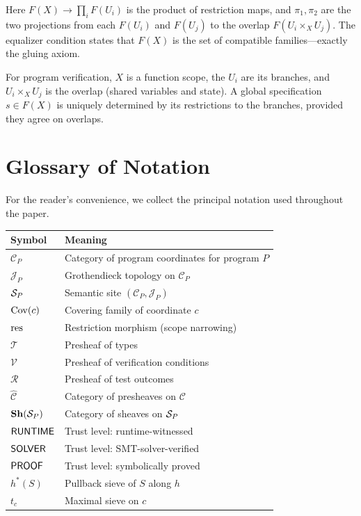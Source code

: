 \documentclass[11pt]{article}
\begin{document}
Here $F(X) \to \prod_i F(U_i)$ is the product of restriction maps, and
$\pi_1, \pi_2$ are the two projections from each $F(U_i)$ and $F(U_j)$ to
the overlap $F(U_i \times_X U_j)$.  The equalizer condition states that
$F(X)$ is the set of compatible families---exactly the gluing axiom.

For program verification, $X$ is a function scope, the $U_i$ are its branches,
and $U_i \times_X U_j$ is the overlap (shared variables and state).  A global
specification $s \in F(X)$ is uniquely determined by its restrictions to the
branches, provided they agree on overlaps.

\section{Glossary of Notation}\label{app:notation}

For the reader's convenience, we collect the principal notation used
throughout the paper.

\medskip
\begin{center}
\begin{tabular}{@{}ll@{}}
\toprule
\textbf{Symbol} & \textbf{Meaning} \\
\midrule
$\mathcal{C}_P$ & Category of program coordinates for program $P$ \\
$\mathscr{J}_P$ & Grothendieck topology on $\mathcal{C}_P$ \\
$\mathcal{S}_P$ & Semantic site $(\mathcal{C}_P, \mathscr{J}_P)$ \\
$\mathrm{Cov}(c)$ & Covering family of coordinate $c$ \\
$\mathrm{res}$ & Restriction morphism (scope narrowing) \\
$\mathcal{T}$ & Presheaf of types \\
$\mathcal{V}$ & Presheaf of verification conditions \\
$\mathcal{R}$ & Presheaf of test outcomes \\
$\widehat{\mathcal{C}}$ & Category of presheaves on $\mathcal{C}$ \\
$\mathbf{Sh}(\mathcal{S}_P)$ & Category of sheaves on $\mathcal{S}_P$ \\
$\mathsf{RUNTIME}$ & Trust level: runtime-witnessed \\
$\mathsf{SOLVER}$ & Trust level: SMT-solver-verified \\
$\mathsf{PROOF}$ & Trust level: symbolically proved \\
$h^*(S)$ & Pullback sieve of $S$ along $h$ \\
$t_c$ & Maximal sieve on $c$ \\
\bottomrule
\end{tabular}
\end{center}
\end{document}
